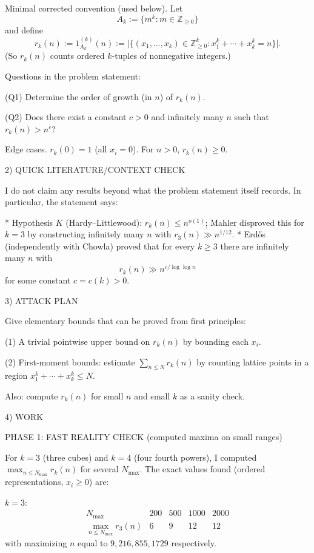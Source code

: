 Minimal corrected convention (used below).
Let
\[
A_k:=\{m^k: m\in\mathbb Z_{\ge 0}\}
\]
and define
\[
r_k(n):=1_{A_k}^{(k)}(n):=\bigl|\{(x_1,\dots,x_k)\in \mathbb Z_{\ge 0}^k: x_1^k+\cdots+x_k^k=n\}\bigr|.
\]
(So $r_k(n)$ counts ordered $k$-tuples of nonnegative integers.)

Questions in the problem statement:

(Q1) Determine the order of growth (in $n$) of $r_k(n)$.

(Q2) Does there exist a constant $c>0$ and infinitely many $n$ such that $r_k(n)>n^c$?

Edge cases.
$r_k(0)=1$ (all $x_i=0$). For $n>0$, $r_k(n)\ge 0$.


2) QUICK LITERATURE/CONTEXT CHECK

I do not claim any results beyond what the problem statement itself records.
In particular, the statement says:

* Hypothesis $K$ (Hardy--Littlewood): $r_k(n)\le n^{o(1)}$; Mahler disproved this for $k=3$ by constructing infinitely many $n$ with $r_3(n)\gg n^{1/12}$.
* Erd\H{o}s (independently with Chowla) proved that for every $k\ge 3$ there are infinitely many $n$ with
\[
r_k(n)\gg n^{c/\log\log n}
\]
for some constant $c=c(k)>0$.


3) ATTACK PLAN

Give elementary bounds that can be proved from first principles:

(1) A trivial pointwise upper bound on $r_k(n)$ by bounding each $x_i$.

(2) First-moment bounds: estimate $\sum_{n\le N} r_k(n)$ by counting lattice points in a region $x_1^k+\cdots+x_k^k\le N$.

Also: compute $r_k(n)$ for small $n$ and small $k$ as a sanity check.


4) WORK

PHASE 1: FAST REALITY CHECK (computed maxima on small ranges)

For $k=3$ (three cubes) and $k=4$ (four fourth powers), I computed $\max_{n\le N_{\max}} r_k(n)$ for several $N_{\max}$.
The exact values found (ordered representations, $x_i\ge 0$) are:

$k=3$:
\[
\begin{array}{c|cccc}
N_{\max} & 200 & 500 & 1000 & 2000\\\hline
\max_{n\le N_{\max}} r_3(n) & 6 & 9 & 12 & 12
\end{array}
\]
with maximizing $n$ equal to $9,216,855,1729$ respectively.

